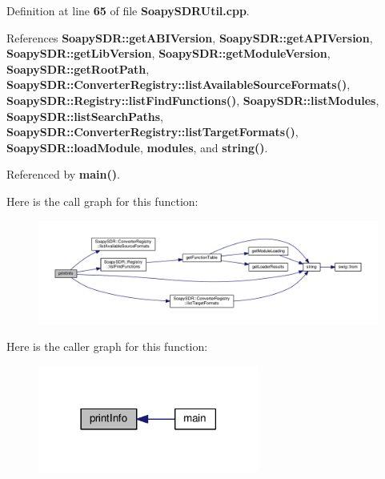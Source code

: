 Definition at line {\bf 65} of file {\bf Soapy\+S\+D\+R\+Util.\+cpp}.



References {\bf Soapy\+S\+D\+R\+::get\+A\+B\+I\+Version}, {\bf Soapy\+S\+D\+R\+::get\+A\+P\+I\+Version}, {\bf Soapy\+S\+D\+R\+::get\+Lib\+Version}, {\bf Soapy\+S\+D\+R\+::get\+Module\+Version}, {\bf Soapy\+S\+D\+R\+::get\+Root\+Path}, {\bf Soapy\+S\+D\+R\+::\+Converter\+Registry\+::list\+Available\+Source\+Formats()}, {\bf Soapy\+S\+D\+R\+::\+Registry\+::list\+Find\+Functions()}, {\bf Soapy\+S\+D\+R\+::list\+Modules}, {\bf Soapy\+S\+D\+R\+::list\+Search\+Paths}, {\bf Soapy\+S\+D\+R\+::\+Converter\+Registry\+::list\+Target\+Formats()}, {\bf Soapy\+S\+D\+R\+::load\+Module}, {\bf modules}, and {\bf string()}.



Referenced by {\bf main()}.



Here is the call graph for this function\+:
\nopagebreak
\begin{figure}[H]
\begin{center}
\leavevmode
\includegraphics[width=350pt]{d3/dca/SoapySDRUtil_8cpp_a66eb714e8ab3741938794494ccb095fc_cgraph}
\end{center}
\end{figure}




Here is the caller graph for this function\+:
\nopagebreak
\begin{figure}[H]
\begin{center}
\leavevmode
\includegraphics[width=206pt]{d3/dca/SoapySDRUtil_8cpp_a66eb714e8ab3741938794494ccb095fc_icgraph}
\end{center}
\end{figure}


